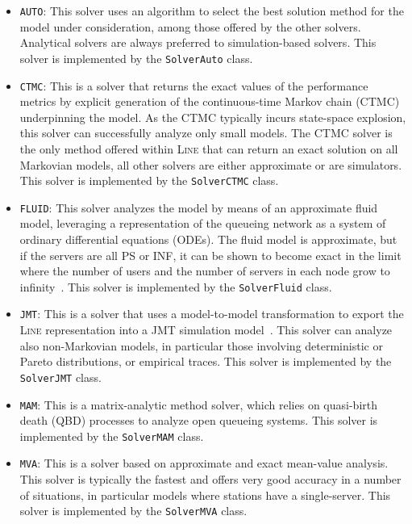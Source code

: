 \begin{itemize}
\item \texttt{AUTO}: This solver uses an algorithm to select the best solution method for the model under consideration, among those offered by the other solvers. Analytical solvers are always preferred to simulation-based solvers. This solver is implemented by the \texttt{SolverAuto} class.
\item \texttt{CTMC}: This is a solver that returns the exact values of the performance metrics by explicit generation of the continuous-time Markov chain (CTMC) underpinning the model. As the CTMC typically incurs state-space explosion, this solver can successfully analyze only small models. The {CTMC} solver is the only method offered within \textsc{Line} that can return an exact solution on all Markovian models, all other solvers are either approximate or are simulators. This solver is implemented by the \texttt{SolverCTMC} class.
\item \texttt{FLUID}: This solver analyzes the model by means of an approximate fluid model, leveraging a representation of the queueing network as a system of ordinary differential equations (ODEs). The fluid model is approximate, but if the servers are all PS or INF, it can be shown to become exact in the limit where the number of users and the number of servers in each node grow to infinity~\cite{pere.casa13}. This solver is implemented by the \texttt{SolverFluid} class.
\item \texttt{JMT}: This is a solver that uses a model-to-model transformation to export the \textsc{Line} representation into a JMT simulation model~\cite{BerCS07}. This solver can analyze also non-Markovian models, in particular those involving deterministic or Pareto distributions, or empirical traces. This solver is implemented by the \texttt{SolverJMT} class.
\item \texttt{MAM}: This is a matrix-analytic method solver, which relies on quasi-birth death (QBD) processes to analyze open queueing systems. This solver is implemented by the \texttt{SolverMAM} class.
\item \texttt{MVA}: This is a solver based on approximate and exact mean-value analysis. This solver is typically the fastest and offers very good accuracy in a number of situations, in particular models where stations have a single-server. This solver is implemented by the \texttt{SolverMVA} class. %

\end{itemize}
